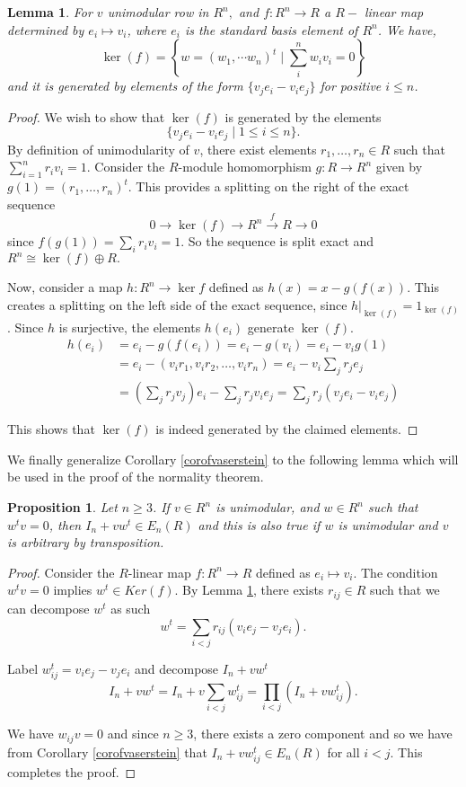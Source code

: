 \documentclass[12pt]{report}
\numberwithin{equation}{section}
\newcounter{dummy} \numberwithin{dummy}{section}
\newtheorem{lemma}[dummy]{Lemma}
\newtheorem{proposition}[dummy]{Proposition}
\begin{document}
		\begin{lemma}\label{kernelf}
			For $v$ unimodular row in $R^n,$ and $f: R^n \to R$ a $R-$ linear map determined by $e_i \mapsto v_i $, where $e_i $ is the standard basis element of $R^n$. We have,
			\[ \ker (f) =\left\{w=(w_1,\cdots w_n)^t \mid \sum_i^n w_i v_i =0\right\} \] and it is generated by elements of the form \( \{ v_j e_i - v_i e_j \} \) for positive $i \leq n$.
			\end{lemma}
		\begin{proof}
			We wish to show that $\ker(f)$ is generated by the elements $$\{v_je_i - v_ie_j \mid 1 \leq i \leq n\}.$$
			By definition of unimodularity of $v$, there exist elements $r_1, \ldots, r_n \in R$ such that $\sum_{i=1}^n r_iv_i = 1$. Consider the 
			$R$-module homomorphism $g: R \to R^n$ given by $g(1) = (r_1, \ldots, r_n)^t$. This provides a splitting 
			on the right of the exact sequence \[ 0 \to \ker (f ) \to R^n \xrightarrow{f} R \to 0 \] since $f(g(1))=\sum_i r_iv_i = 1$. So the sequence is split exact and $R^n \cong \ker (f) \oplus R.$
			
			Now, consider a map $h:R^n \to \ker f$ defined as  $h(x)=x - g(f(x))$. This creates a splitting on the left side of the 
			exact sequence, since  $h|_{\ker(f)} = 1_{\ker(f)}$. Since $h$ is surjective, the 
			elements $h(e_i)$ generate $\ker(f)$.
			\begin{align*}
				h(e_i) &= e_i - g(f(e_i)) = e_i - g(v_i) = e_i-v_ig(1)\\
				&=e_i-(v_ir_1, v_i r_2, \ldots, v_i r_n)= e_i - v_i \sum_j r_je_j\\
				&= (\sum_j r_jv_j)e_i - \sum_j r_jv_ie_j = \sum_j r_j(v_je_i - v_ie_j)
			\end{align*}
			
			This shows that $\ker(f)$ is indeed generated by the claimed elements.
		\end{proof}
		
		We finally generalize Corollary \ref{corofvaserstein} to the following lemma which will be used in the proof of the normality theorem.
		\begin{proposition}\label{finalpropfornormality}
			Let $n \geq 3$. If $v \in R^n$ is unimodular, and $w \in R^n$ such that $w^tv = 0$, then $I_n + vw^t \in E_n(R)$ and this is also true if $w$ is unimodular and $v$ is arbitrary by transposition.
		\end{proposition}
		
		\begin{proof}
			Consider the $R$-linear map $f:R^n \to R$ defined as $e_i \mapsto v_i$. The condition $w^tv = 0 $ implies $w^t \in Ker(f)$. By Lemma \ref{kernelf}, there exists $r_{ij} \in R$ such that we can decompose $w^t$ as such
			\[
			w^t = \sum_{i<j} r_{ij}(v_ie_j - v_je_i).
			\]
			
			Label $w_{ij}^t = v_ie_j - v_je_i$ and decompose $I_n+vw^t$ 
			\[
			I_n + vw^t = I_n + v\sum_{i<j} w_{ij}^t = \prod_{i<j}(I_n + vw_{ij}^t).
			\]
			
			We have $w_{ij}v=0$ and since $n \geq 3$, there exists a zero component and so we have from Corollary \ref{corofvaserstein} that $I_n + vw_{ij}^t \in E_n(R)$ for all $i < j$. This completes the proof.
		\end{proof}
	
\end{document}
